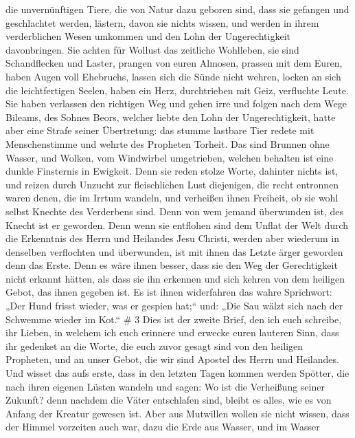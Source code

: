 die unvernünftigen Tiere, die von Natur dazu geboren sind, dass sie
gefangen und geschlachtet werden, lästern, davon sie nichts wissen, und
werden in ihrem verderblichen Wesen umkommen  und den Lohn
der Ungerechtigkeit davonbringen. Sie achten für Wollust das zeitliche
Wohlleben, sie sind Schandflecken und Laster, prangen von euren Almosen,
prassen mit dem Euren,  haben Augen voll Ehebruchs, lassen
sich die Sünde nicht wehren, locken an sich die leichtfertigen Seelen,
haben ein Herz, durchtrieben mit Geiz, verfluchte Leute. 
Sie haben verlassen den richtigen Weg und gehen irre und folgen nach dem
Wege Bileams, des Sohnes Beors, welcher liebte den Lohn der
Ungerechtigkeit,  hatte aber eine Strafe seiner
Übertretung: das stumme lastbare Tier redete mit Menschenstimme und
wehrte des Propheten Torheit.  Das sind Brunnen ohne
Wasser, und Wolken, vom Windwirbel umgetrieben, welchen behalten ist
eine dunkle Finsternis in Ewigkeit.  Denn sie reden stolze
Worte, dahinter nichts ist, und reizen durch Unzucht zur fleischlichen
Lust diejenigen, die recht entronnen waren denen, die im Irrtum wandeln,
 und verheißen ihnen Freiheit, ob sie wohl selbst Knechte
des Verderbens sind. Denn von wem jemand überwunden ist, des Knecht ist
er geworden.  Denn wenn sie entflohen sind dem Unflat der
Welt durch die Erkenntnis des Herrn und Heilandes Jesu Christi, werden
aber wiederum in denselben verflochten und überwunden, ist mit ihnen das
Letzte ärger geworden denn das Erste.  Denn es wäre ihnen
besser, dass sie den Weg der Gerechtigkeit nicht erkannt hätten, als
dass sie ihn erkennen und sich kehren von dem heiligen Gebot, das ihnen
gegeben ist.  Es ist ihnen widerfahren das wahre
Sprichwort: „Der Hund frisst wieder, was er gespien hat;`` und: „Die Sau
wälzt sich nach der Schwemme wieder im Kot.`` \# 3  Dies ist
der zweite Brief, den ich euch schreibe, ihr Lieben, in welchem ich euch
erinnere und erwecke euren lauteren Sinn,  dass ihr gedenket
an die Worte, die euch zuvor gesagt sind von den heiligen Propheten, und
an unser Gebot, die wir sind Apostel des Herrn und Heilandes.
 Und wisset das aufs erste, dass in den letzten Tagen kommen
werden Spötter, die nach ihren eigenen Lüsten wandeln  und
sagen: Wo ist die Verheißung seiner Zukunft? denn nachdem die Väter
entschlafen sind, bleibt es alles, wie es von Anfang der Kreatur gewesen
ist.  Aber aus Mutwillen wollen sie nicht wissen, dass der
Himmel vorzeiten auch war, dazu die Erde aus Wasser, und im Wasser
